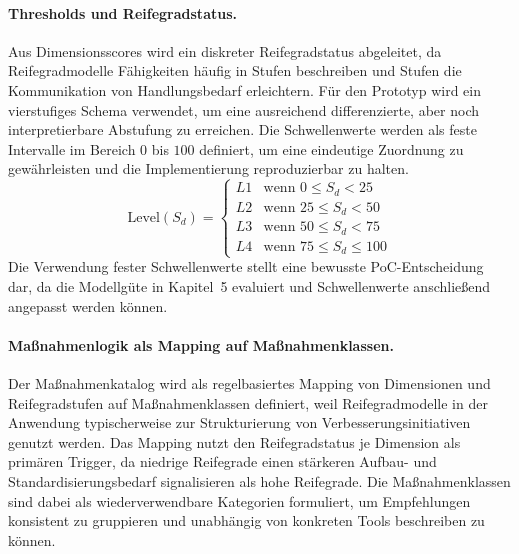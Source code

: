 \paragraph{Thresholds und Reifegradstatus.}
Aus Dimensionsscores wird ein diskreter Reifegradstatus abgeleitet, da Reifegradmodelle Fähigkeiten häufig in Stufen beschreiben und Stufen die Kommunikation von Handlungsbedarf erleichtern.\cite{RoeglingerPoeppelbuss2011BPMMaturityModels,PoeppeelbussRoeglinger2011DesignPrinciples}
Für den Prototyp wird ein vierstufiges Schema verwendet, um eine ausreichend differenzierte, aber noch interpretierbare Abstufung zu erreichen.\cite{RoeglingerPoeppelbuss2011BPMMaturityModels}
Die Schwellenwerte werden als feste Intervalle im Bereich $0$ bis $100$ definiert, um eine eindeutige Zuordnung zu gewährleisten und die Implementierung reproduzierbar zu halten.\cite{BeckerKnackstedtPoeppelbuss2009ProcedureModel,deBruin2005MainPhases}
\begin{equation}
\text{Level}(S_d)=
\begin{cases}
L1 & \text{wenn } 0 \le S_d < 25\\
L2 & \text{wenn } 25 \le S_d < 50\\
L3 & \text{wenn } 50 \le S_d < 75\\
L4 & \text{wenn } 75 \le S_d \le 100
\end{cases}
\end{equation}
Die Verwendung fester Schwellenwerte stellt eine bewusste PoC-Entscheidung dar, da die Modellgüte in Kapitel~5 evaluiert und Schwellenwerte anschließend angepasst werden können.\cite{Hevner2004DesignScience,Nunamaker1990SystemsDevelopment}

\paragraph{Maßnahmenlogik als Mapping auf Maßnahmenklassen.}
Der Maßnahmenkatalog wird als regelbasiertes Mapping von Dimensionen und Reifegradstufen auf Maßnahmenklassen definiert, weil Reifegradmodelle in der Anwendung typischerweise zur Strukturierung von Verbesserungsinitiativen genutzt werden.\cite{RoeglingerPoeppelbuss2011BPMMaturityModels,PoeppeelbussRoeglinger2011DesignPrinciples}
Das Mapping nutzt den Reifegradstatus je Dimension als primären Trigger, da niedrige Reifegrade einen stärkeren Aufbau- und Standardisierungsbedarf signalisieren als hohe Reifegrade.\cite{RoeglingerPoeppelbuss2011BPMMaturityModels}
Die Maßnahmenklassen sind dabei als wiederverwendbare Kategorien formuliert, um Empfehlungen konsistent zu gruppieren und unabhängig von konkreten Tools beschreiben zu können.\cite{PoeppeelbussRoeglinger2011DesignPrinciples,MarchSmith1995DesignNaturalScience}

